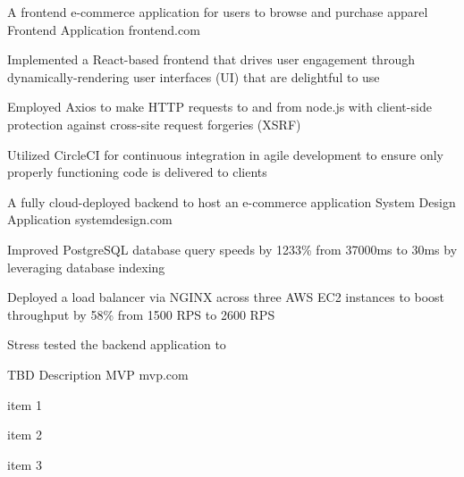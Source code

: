

\begin{cventries}

  \cventry
    {A frontend e-commerce application for users to browse and purchase apparel} %
    {Frontend Application} %
    {frontend.com} %
    {} %
    {
      \begin{cvitems} %
        \item {Implemented a React-based frontend that drives user engagement through dynamically-rendering user interfaces (UI) that are delightful to use}
        \item {Employed Axios to make HTTP requests to and from node.js with client-side protection against cross-site request forgeries (XSRF)}
        \item {Utilized CircleCI for continuous integration in agile development to ensure only properly functioning code is delivered to clients}
      \end{cvitems}
    }

  \cventry
    {A fully cloud-deployed backend to host an e-commerce application } %
    {System Design Application} %
    {systemdesign.com} %
    {} %
    {
      \begin{cvitems} %
        \item {Improved PostgreSQL database query speeds by 1233\% from 37000ms to 30ms by leveraging database indexing}
        \item {Deployed a load balancer via NGINX across three AWS EC2 instances to boost throughput by 58\% from 1500 RPS to 2600 RPS}
        \item {Stress tested the backend application to }
      \end{cvitems}
    }

\cventry
{TBD Description} %
{MVP} %
{mvp.com} %
{} %
{
  \begin{cvitems} %
    \item {item 1}
    \item {item 2}
    \item {item 3}
  \end{cvitems}
}


\end{cventries}

